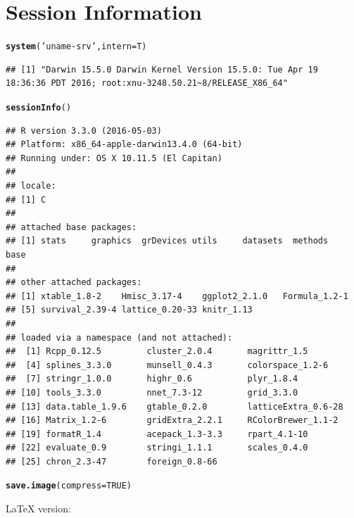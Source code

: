 \documentclass[8pt]{beamer}\usepackage[]{graphicx}\usepackage[]{color}
\makeatletter
\newcommand{\hlnum}[1]{\textcolor[rgb]{0.686,0.059,0.569}{#1}}%
\newcommand{\hlstr}[1]{\textcolor[rgb]{0.192,0.494,0.8}{#1}}%
\newcommand{\hlstd}[1]{\textcolor[rgb]{0.345,0.345,0.345}{#1}}%
\newcommand{\hlkwc}[1]{\textcolor[rgb]{0.333,0.667,0.333}{#1}}%
\newcommand{\hlkwd}[1]{\textcolor[rgb]{0.737,0.353,0.396}{\textbf{#1}}}%
\newenvironment{kframe}{%
 \def\at@end@of@kframe{}%
 \ifinner\ifhmode%
  \def\at@end@of@kframe{\end{minipage}}%
  \begin{minipage}{\columnwidth}%
 \fi\fi%
 \def\FrameCommand##1{\hskip\@totalleftmargin \hskip-\fboxsep
 \colorbox{shadecolor}{##1}\hskip-\fboxsep
     \hskip-\linewidth \hskip-\@totalleftmargin \hskip\columnwidth}%
 \MakeFramed {\advance\hsize-\width
   \@totalleftmargin\z@ \linewidth\hsize
   \@setminipage}}%
 {\par\unskip\endMakeFramed%
 \at@end@of@kframe}
\newenvironment{knitrout}{}{} %
\makeatother
\begin{document}
\section{Session Information}
\begin{knitrout}\footnotesize
{}\color{fgcolor}\begin{kframe}
\begin{alltt}
\hlkwd{system}\hlstd{(}\hlstr{'uname -srv'}\hlstd{,}\hlkwc{intern}\hlstd{=T)}
\end{alltt}
\begin{verbatim}
## [1] "Darwin 15.5.0 Darwin Kernel Version 15.5.0: Tue Apr 19 18:36:36 PDT 2016; root:xnu-3248.50.21~8/RELEASE_X86_64"
\end{verbatim}
\begin{alltt}
\hlkwd{sessionInfo}\hlstd{()}
\end{alltt}
\begin{verbatim}
## R version 3.3.0 (2016-05-03)
## Platform: x86_64-apple-darwin13.4.0 (64-bit)
## Running under: OS X 10.11.5 (El Capitan)
## 
## locale:
## [1] C
## 
## attached base packages:
## [1] stats     graphics  grDevices utils     datasets  methods   base     
## 
## other attached packages:
## [1] xtable_1.8-2    Hmisc_3.17-4    ggplot2_2.1.0   Formula_1.2-1  
## [5] survival_2.39-4 lattice_0.20-33 knitr_1.13     
## 
## loaded via a namespace (and not attached):
##  [1] Rcpp_0.12.5         cluster_2.0.4       magrittr_1.5       
##  [4] splines_3.3.0       munsell_0.4.3       colorspace_1.2-6   
##  [7] stringr_1.0.0       highr_0.6           plyr_1.8.4         
## [10] tools_3.3.0         nnet_7.3-12         grid_3.3.0         
## [13] data.table_1.9.6    gtable_0.2.0        latticeExtra_0.6-28
## [16] Matrix_1.2-6        gridExtra_2.2.1     RColorBrewer_1.1-2 
## [19] formatR_1.4         acepack_1.3-3.3     rpart_4.1-10       
## [22] evaluate_0.9        stringi_1.1.1       scales_0.4.0       
## [25] chron_2.3-47        foreign_0.8-66
\end{verbatim}
\begin{alltt}
\hlkwd{save.image}\hlstd{(}\hlkwc{compress} \hlstd{=} \hlnum{TRUE}\hlstd{)}
\end{alltt}
\end{kframe}
\end{knitrout}
\scriptsize{\LaTeX{} version: \LaTeXe~ \fmtversion}
\end{document}
